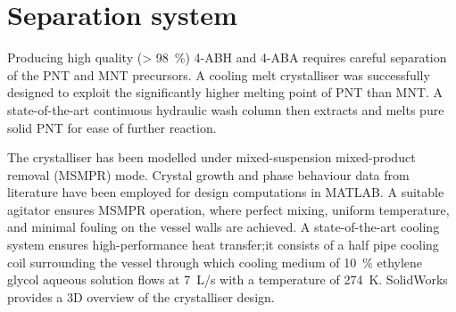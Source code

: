 \section*{Separation system}

Producing high quality (\SI{> 98}{\percent}) 4-ABH and 4-ABA requires careful separation of the PNT and MNT precursors. A cooling melt crystalliser was successfully designed to exploit the significantly higher melting point of PNT than MNT. A state-of-the-art continuous hydraulic wash column then extracts and melts pure solid PNT for ease of further reaction. 


The crystalliser has been modelled under mixed-suspension mixed-product removal (MSMPR) mode. Crystal growth and phase behaviour data from literature have been employed for design computations in MATLAB. A suitable agitator ensures MSMPR operation, where perfect mixing, uniform temperature, and minimal fouling on the vessel walls are achieved. A state-of-the-art cooling system ensures high-performance heat transfer;it consists of a half pipe cooling coil surrounding the vessel through which cooling medium of \SI{10}{\percent} ethylene glycol aqueous solution flows at \SI{7}{L/s} with a temperature of \SI{274}{K}. SolidWorks  provides a 3D overview of the crystalliser design.


